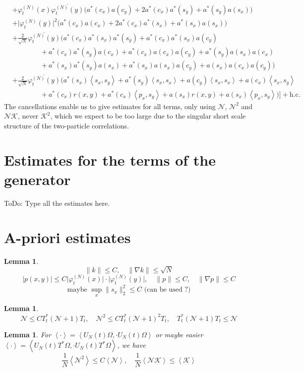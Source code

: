 \documentclass[11pt,a4paper]{scrartcl} %
\newtheorem{lem}[thm]{Lemma}
\newcommand{\Ncal}{\mathcal{N}}		%
\newcommand{\Kcal}{\mathcal{K}}		%
\newcommand{\hc}{\mbox{h.c.}}		%
\newcommand{\scal}[2]{\left<#1,#2\right>} %
\newcommand{\cc}[1]{\overline{#1}}	%
\newcommand{\norm}[1]{\lVert#1\rVert}	%
\newcommand{\ev}[1]{\left<#1\right>}	%
\newcommand{\ph}{\varphi_t^{(N)}}	%
\newcommand{\bd}{\begin{displaymath}}			%
\newcommand{\ed}{\end{displaymath}}
\begin{document}
\begin{align}
& + \ph(x) \cc{\ph(y)} \Big( a^*(c_x) a(c_y) + 2 a^*(c_x) a^*(s_y) + a^*(s_y) a(s_x) \Big) \\
& + \lvert \ph(y) \rvert^2 \Big( a^*(c_x) a(c_x) + 2 a^*(c_x) a^*(s_x) + a^*(s_x) a(s_x) \Big) \\
& + \frac{2}{\sqrt{N}}\cc{\ph(y)} \bigg(    a^*(c_x) a^*(s_x) a^*(s_y) + a^*(c_x) a^*(s_x) a(c_y) \\
					    & \qquad\qquad + a^*(c_x) a^*(s_y) a(c_x) + a^*(c_x) a(c_x) a(c_y) + a^*(s_y) a(s_x) a(c_x)\\
					    & \qquad\qquad + a^*(s_x) a^*(s_y) a(s_x) + a^*(s_x) a(s_x) a(c_y) + a(s_x) a(c_x) a(c_y)  \bigg) \\
& + \frac{2}{\sqrt{N}}\cc{\ph(y)} \bigg(    a^*(s_x) \scal{s_x}{s_y} + a^*(s_y) \scal{s_x}{s_x}  + a(c_y) \scal{s_x}{s_x} + 							a(c_x) \scal{s_x}{s_y} \\
					    & \qquad\qquad + a^*(c_x)r(x,y) + a^*(c_x)\scal{p_x}{s_y} + a(s_x)r(x,y) + 			a(s_x)\scal{p_x}{s_y}		\bigg)    \Big] + \hc
\end{align}
The cancellations enable us to give estimates for all terms, only using $\Ncal$, $\Ncal^2$ and $\Ncal \Kcal$, never $\Kcal^2$, which we expect to be too large due to the singular short scale structure of the two-particle correlations.


\section{Estimates for the terms of the generator}
ToDo: Type all the estimates here.


\section{A-priori estimates}
\begin{lem}
 \bd
  \norm{k} \leq C, \quad \norm{\nabla k} \leq \sqrt{N}
 \ed
 \bd
  \lvert p(x,y) \rvert \leq C \lvert \ph(x) \rvert\cdot \lvert \ph(y) \rvert, \quad \norm{p} \leq C, \quad \norm{\nabla p} \leq C
 \ed
\bd
\mbox{maybe } \sup_x \norm{s_x}_2^2 \leq C \mbox{ (can be used ?)}
\ed
\end{lem}

\begin{lem}
\bd
\Ncal \leq C T^*_t (\Ncal + 1) T_t, \quad \Ncal^2 \leq C T^*_t (\Ncal + 1)^2 T_t, \quad T^*_t (\Ncal + 1) T_t \leq \Ncal
\ed
\end{lem}


\begin{lem}
\label{lem:nsquaredbound}
For $\ev{\cdot} = \scal{U_N(t)\Omega}{\cdot U_N(t)\Omega}$ or maybe easier $\ev{\cdot} = \scal{U_N(t)T^*\Omega}{\cdot U_N(t)T^*\Omega}$, we have
 \bd
 \frac{1}{N}\ev{\Ncal^2} \leq C \ev{\Ncal}, \quad \frac{1}{N}\ev{\Ncal \Kcal} \leq \ev{\Kcal}
 \ed
\end{lem}
\end{document}
